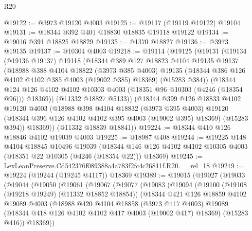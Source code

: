 \begin{lexlean}{R20}
\begin{coremodule}
@19122 := @3973 @19120 @4003
@19125 := @19117 (@19119 @19122) @19104
@19131 := @18344 @392 @401 @18830 @18835 @19118 @19122
@19134 := @19016 @391 @18825 @18829
@19135 := @1370 @18827
@19136 := @3973 @19135
@19137 := @10304 @4003
@19218 := @19114
    (@19125
      (@19131
        (@19134
          (@19136 @19137)
          @19118
          (@18344
            @389
            @127
            @18823
            @4104
            @19135
            @19137
            (@18988
              @388
              @4104
              @18822
              (@3973 @385 @4003)
              @19135
              (@18344 @386 @126 @4102 @4102 @385 @4003 (@19002 @385) @18369)
              (@15283 @384))
            (@18344
              @124
              @126
              @4102
              @4102
              @10303
              @4003
              (@18351 @96 @10303 (@4246 (@18354 @96)))
              @18369))
          (@11332 @18827 @5133))
        (@18344
          @399
          @126
          @18833
          @4102
          @19120
          @4003
          (@18988
            @398
            @4104
            @18832
            (@3973 @395 @4003)
            @19120
            (@18344 @396 @126 @4102 @4102 @395 @4003 (@19002 @395) @18369)
            (@15283 @394))
          @18369))
      (@11332 @18839 @18841))
@19224 := @18344 @410 @126 @18846 @4102 @19039 @4003
@19225 := @18987 @408
@19244 := @19225
    @148
    @4104
    @18845
    @10496
    @19039
    (@18344 @146 @126 @4102 @4102 @10305 @4003 (@18351 @22 @10305 (@4246 (@18354 @22))) @18369)
@19245 := LexLeanPreserve.Cd542376f089388a4a783f2fc4c26811f.R20.__rel_18
@19249 := @19224 (@19244 (@19245 @4117)) @18369
@19389 := @19015
    (@19027
      (@19033
        (@19044
          (@19050
            (@19061
              (@19067
                (@19077
                  (@19083
                    (@19094
                      (@19100
                        (@19108 (@19218 @19249) (@11332 @18852 @18854))
                        (@18344
                          @421
                          @126
                          @18859
                          @4102
                          @19089
                          @4003
                          (@18988
                            @420
                            @4104
                            @18858
                            (@3973 @417 @4003)
                            @19089
                            (@18344 @418 @126 @4102 @4102 @417 @4003 (@19002 @417) @18369)
                            (@15283 @416))
                          @18369))

\end{coremodule}
\end{lexlean}
